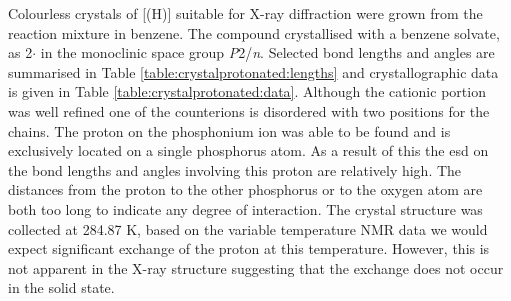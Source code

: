 {%



Colourless crystals of [\tButhixantphos(H)] suitable for X-ray diffraction were grown from the reaction mixture in benzene.  The compound crystallised with a benzene solvate, as 2$\cdot{}$ in the monoclinic space group \emph{P}2/\emph{n}.  Selected bond lengths and angles are summarised in Table \ref{table:crystalprotonated:lengths} and crystallographic data is given in Table \ref{table:crystalprotonated:data}.  Although the cationic portion was well refined one of the counterions is disordered with two positions for the  chains.  The proton on the phosphonium ion was able to be found and is exclusively located on a single phosphorus atom.  As a result of this the \gls{esd} on the bond lengths and angles involving this proton are relatively high.  The distances from the proton to the other phosphorus or to the oxygen atom are both too long to indicate any degree of interaction.  The crystal structure was collected at 284.87 K, based on the variable temperature NMR data we would expect significant exchange of the proton at this temperature.  However, this is not apparent in the X-ray structure suggesting that the exchange does not occur in the solid state.  

}
